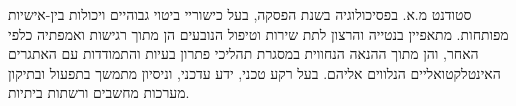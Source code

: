 \begin{minipage}[t]{1\linewidth}
	\vspace{0.25cm} %
	סטודנט מ.א. בפסיכולוגיה בשנת הפסקה, בעל כישוריי ביטוי גבוהיים ויכולות בין-אישיות מפותחות. מתאפיין בנטייה והרצון לתת שירות וטיפול הנובעים הן מתוך רגישות ואמפתיה כלפי האחר, והן מתוך ההנאה הנחווית במסגרת תהליכי פתרון בעיות והתמודדות עם האתגרים האינטלקטואליים הנלווים אליהם. בעל רקע טכני, ידע עדכני, וניסיון מתמשך בתפעול ובתיקון מערכות מחשבים ורשתות ביתיות. 
\end{minipage}